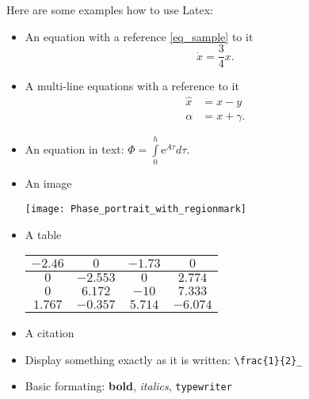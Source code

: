 Here are some examples how to use Latex:
\begin{itemize}
 \item An equation with a reference \eqref{eq_sample} to it
 \begin{equation}
  \dot{x} = \frac{3}{4} x. \label{eq_sample}
 \end{equation}
 \item A multi-line equations with a reference to it
 \begin{align*}
  \hat{x} &= x - y\\
  \alpha &= x + \gamma.
 \end{align*}
 \item An equation in text: $\Phi = \int\limits_{0}^{h} \mathrm{e}^{A\tau} d \tau$.
 \item An image
 \begin{center}
  \texttt{[image: Phase\_portrait\_with\_regionmark]}
 \end{center}
 \item A table

 \begin{tabular}{@{\vrule height 10.5pt depth4pt  width0pt}|c|c|c|c|}
    \hline
     $-2.46$ & $0$ & $-1.73$ & $0$ \\ \hline
     $0$ & $-2.553$ & $0$ & $2.774$ \\ \hline
     $0$ & $6.172$ & $-10$ & $7.333$ \\ \hline
     $1.767$ & $-0.357$ & $5.714$ & $-6.074$ \\ \hline
  \end{tabular}
  \item A citation \cite{Oetiker:2008:TheNotSoShortIntroductiontoLaTeXe}
  \item Display something exactly as it is written: \verb|\frac{1}{2}_|
  \item Basic formating: \textbf{bold}, \textit{italics}, \texttt{typewriter}
\end{itemize}

